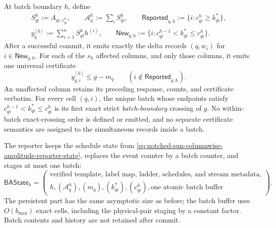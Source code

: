 \begin{theorem}
At batch boundary $h$, define
\begin{equation}
 \begin{gathered}
  S_{qi}^{h}:=A_{qi,c_{qi}^{h}},
  \qquad
  \mathcal A_q^{h}:=\sum_i S_{qi}^{h},
  \qquad
  \mathsf{Reported}_{q,h}:=\{i:c_{qi}^{h}\geq k_{qi}^*\},\\
  y_q^{[h]}:=\sum_{i=1}^{n}S_{qi}^{h}h^{(i)},
  \qquad
  \mathsf{New}_{q,h}:=
  \{i:c_{qi}^{h-1}<k_{qi}^*\leq c_{qi}^{h}\}.
 \end{gathered}
 \label{eq:notched-sun-batch-boundary-state}
\end{equation}
After a successful commit, it emits exactly the delta records
$(q,w_i)$ for $i\in\mathsf{New}_{q,h}$.  For each of the $s_h$ affected
columns, and only those columns, it emits one universal certificate
\begin{equation}
 y_{q,i}^{[h]}\leq g-m_q
 \qquad(i\notin\mathsf{Reported}_{q,h}).
 \label{eq:notched-sun-batch-certificate}
\end{equation}
An unaffected column retains its preceding response, counts, and certificate
verbatim.  For every cell $(q,i)$, the unique batch whose endpoints satisfy
$c_{qi}^{h-1}<k_{qi}^*\leq c_{qi}^{h}$ is its first exact strict
\emph{batch-boundary} crossing of $g$.  No within-batch exact-crossing order
is defined or emitted, and no separate certificate semantics are assigned to
the simultaneous records inside a batch.

The reporter keeps the schedule state from
\cref{eq:notched-sun-columnwise-amplitude-reporter-state}, replaces the event
counter by a batch counter, and stages at most one batch:
\begin{equation}
 \mathsf{BAState}_h=\left(
 \begin{gathered}
  \text{verified template, label map, ladder, schedules, and stream metadata},\\
  h,(\mathcal A_q^h),(m_q),(k_{qi}^*),(c_{qi}^{h}),
  \text{one atomic batch buffer}
 \end{gathered}
 \right).
 \label{eq:notched-sun-batch-reporter-state}
\end{equation}
The persistent part has the same asymptotic size as before; the batch buffer
uses $O(b_{\max})$ exact cells, including the physical-pair staging by a
constant factor.  Batch contents and history are not retained after commit.


\end{theorem}
